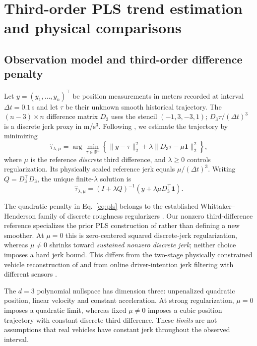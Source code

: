 \section{Third-order PLS trend estimation and physical comparisons}
\label{sec:method}

\subsection{Observation model and third-order difference penalty}
Let $y=(y_1,\ldots,y_n)^\top$ be position measurements in
meters recorded at interval $\Delta t=0.1$\,s and let $\tau$
be their unknown smooth historical trajectory. The $(n-3)\times n$
difference matrix $D_3$ uses the stencil $(-1,3,-3,1)$;
$D_3\tau/(\Delta t)^3$ is a discrete jerk proxy in m/s$^3$.
Following \citet{guerrero2007}, we estimate the trajectory
by minimizing
\begin{equation}\label{eq:pls}
\widehat\tau_{\lambda,\mu}=
\arg\min_{\tau\in\mathbb R^n}
\left\{\|y-\tau\|_2^2+
\lambda\|D_3\tau-\mu\mathbf1\|_2^2\right\},
\end{equation}
where $\mu$ is the reference \emph{discrete} third difference,
and $\lambda\ge0$ controls regularization. Its physically
scaled reference jerk equals $\mu/(\Delta t)^3$.
Writing $Q=D_3^\top D_3$, the unique finite-$\lambda$
solution is
\begin{equation}
\label{eq:pls-solution}
\widehat\tau_{\lambda,\mu}
=(I+\lambda Q)^{-1}
(y+\lambda\mu D_3^\top\mathbf1).
\end{equation}

The quadratic penalty in Eq.~\eqref{eq:pls} belongs to the established
Whittaker--Henderson family of discrete roughness regularizers
\citep{whittaker1923,weinert2007,biessy2026}. Our nonzero
third-difference reference specializes the prior PLS construction
of \citet{guerrero2007} rather than defining a new smoother.
At $\mu=0$ this is zero-centered squared discrete-jerk
regularization, whereas $\mu\ne0$ shrinks toward
\emph{sustained nonzero discrete jerk}; neither choice
imposes a hard jerk bound. This differs from
the two-stage physically constrained vehicle
reconstruction of \citet{fan2024} and from online
driver-intention jerk filtering with different sensors
\citep{bisoffi2017jerk}.

The $d=3$ polynomial nullspace has dimension three: unpenalized
quadratic position, linear velocity and constant acceleration.
At strong regularization, $\mu=0$ imposes a quadratic limit,
whereas fixed $\mu\ne0$ imposes a cubic position trajectory
with constant discrete third difference. These \emph{limits}
are not assumptions that real vehicles have constant jerk
throughout the observed interval.

